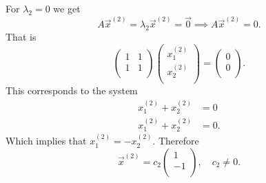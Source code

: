 For $\lambda_2 = 0$ we get
\[ 
A \Vec{x}^{(2)} = \lambda_2 \Vec{x}^{(2)} = \Vec{0} \implies A \Vec{x}^{(2)} = 0
.\]
That is
\[ 
\begin{pmatrix}
1 & 1\\
1 & 1\\
\end{pmatrix} \begin{pmatrix}
x_1^{(2)}\\
x_2^{(2)}\\
\end{pmatrix} = \begin{pmatrix}
0\\
0\\
\end{pmatrix}
.\]
This corresponds to the system
\begin{align*}
  x_1^{(2)} + x_2^{(2)} &= 0 \\
  x_1^{(2)} + x_2^{(2)} &= 0
.\end{align*}
Which implies that $x_1^{(2)} = -x_2^{(2)}$. Therefore
\[ 
\Vec{x}^{(2)} = c_2 \begin{pmatrix}
1\\
-1\\
\end{pmatrix}, \quad c_2 \neq 0
.\]


